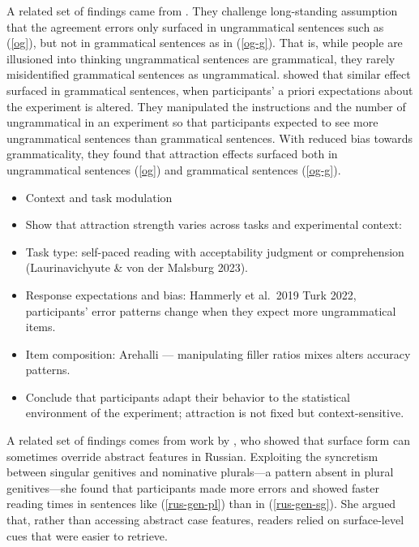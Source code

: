 \documentclass[
  authoryear,
  preprint]{elsarticle}
\providecommand{\tightlist}{%
  \setlength{\itemsep}{0pt}\setlength{\parskip}{0pt}}
\begin{document}
A related set of findings came from \citet{HammerlyEtAl2019}. They
challenge long-standing assumption that the agreement errors only
surfaced in ungrammatical sentences such as (\ref{og}), but not in
grammatical sentences as in (\ref{og-g}). That is, while people are
illusioned into thinking ungrammatical sentences are grammatical, they
rarely misidentified grammatical sentences as ungrammatical.
\citet{HammerlyEtAl2019} showed that similar effect surfaced in
grammatical sentences, when participants' a priori expectations about
the experiment is altered. They manipulated the instructions and the
number of ungrammatical in an experiment so that participants expected
to see more ungrammatical sentences than grammatical sentences. With
reduced bias towards grammaticality, they found that attraction effects
surfaced both in ungrammatical sentences (\ref{og}) and grammatical
sentences (\ref{og-g}).

\begin{exe}
\end{exe}

\begin{itemize}
\tightlist
\item
  Context and task modulation
\item
  Show that attraction strength varies across tasks and experimental
  context:
\item
  Task type: self-paced reading with acceptability judgment or
  comprehension (Laurinavichyute \& von der Malsburg 2023).
\item
  Response expectations and bias: Hammerly et al.~2019 Turk 2022,
  participants' error patterns change when they expect more
  ungrammatical items.
\item
  Item composition: Arehalli --- manipulating filler ratios mixes alters
  accuracy patterns.
\item
  Conclude that participants adapt their behavior to the statistical
  environment of the experiment; attraction is not fixed but
  context-sensitive.
\end{itemize}

A related set of findings comes from work by \citet{Slioussar2018}, who
showed that surface form can sometimes override abstract features in
Russian. Exploiting the syncretism between singular genitives and
nominative plurals---a pattern absent in plural genitives---she found
that participants made more errors and showed faster reading times in
sentences like (\ref{rus-gen-pl}) than in (\ref{rus-gen-sg}). She argued
that, rather than accessing abstract case features, readers relied on
surface-level cues that were easier to retrieve.
\end{document}
